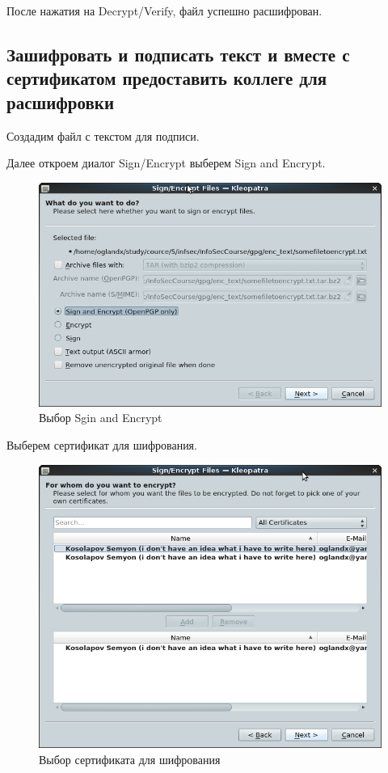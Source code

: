 \documentclass[a4paper]{article}
\begin{document}
После нажатия на Decrypt/Verify, файл успешно расшифрован.

\subsection{Зашифровать и подписать текст и вместе с сертификатом предоставить коллеге для расшифровки}

Создадим файл с текстом для подписи.

Далее откроем диалог Sign/Encrypt выберем Sign and Encrypt.

\begin{figure}[H]
	\begin{center}
		\includegraphics[scale=0.5]{pics/sig_enc.png}
		\caption{Выбор Sgin and Encrypt} 
		\label{pic:pic_name} %
	\end{center}
\end{figure}

Выберем сертификат для шифрования.

\begin{figure}[H]
	\begin{center}
		\includegraphics[scale=0.5]{pics/sig_enc_cert.png}
		\caption{Выбор сертификата для шифрования} 
		\label{pic:pic_name} %
	\end{center}
\end{figure}
\end{document}
